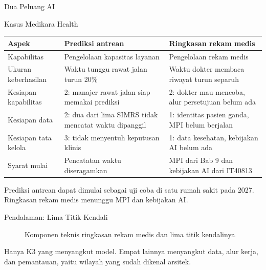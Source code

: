 \documentclass[aspectratio=169, table, 12pt]{beamer}
\begin{document}
\begin{frame}{{\Large Dua Peluang AI}}
  \begin{block}{Kasus Medikara Health}
    \scriptsize
    \begin{tabularx}{\linewidth}{L{2.6cm}YY}
      \hline
      \textbf{Aspek} & \textbf{Prediksi antrean} & \textbf{Ringkasan rekam medis} \\
      \hline
      Kapabilitas & Pengelolaan kapasitas layanan & Pengelolaan rekam medis \\
      \hline
      Ukuran keberhasilan & Waktu tunggu rawat jalan turun 20\% & Waktu dokter membaca riwayat turun separuh \\
      \hline
      Kesiapan kapabilitas & 2: manajer rawat jalan siap memakai prediksi & 2: dokter mau mencoba, alur persetujuan belum ada \\
      \hline
      Kesiapan data & 2: dua dari lima SIMRS tidak mencatat waktu dipanggil & 1: identitas pasien ganda, MPI belum berjalan \\
      \hline
      Kesiapan tata kelola & 3: tidak menyentuh keputusan klinis & 1: data kesehatan, kebijakan AI belum ada \\
      \hline
      Syarat mulai & Pencatatan waktu diseragamkan & MPI dari Bab 9 dan kebijakan AI dari IT40813 \\
      \hline
    \end{tabularx}

    \vspace{4pt}
    \footnotesize Prediksi antrean dapat dimulai sebagai uji coba di satu rumah sakit pada 2027.
    Ringkasan rekam medis menunggu MPI dan kebijakan AI.
  \end{block}
\end{frame}

\begin{frame}{{\Large Pendalaman: Lima Titik Kendali}}
  \centering
  \begin{figure}
    \resizebox{0.88\textwidth}{!}{}
    \caption{Komponen teknis ringkasan rekam medis dan lima titik kendalinya}
  \end{figure}
  \vspace{-4pt}
  \small Hanya K3 yang menyangkut model. Empat lainnya menyangkut data, alur kerja, dan pemantauan,
  yaitu wilayah yang sudah dikenal arsitek.
\end{frame}
\end{document}
